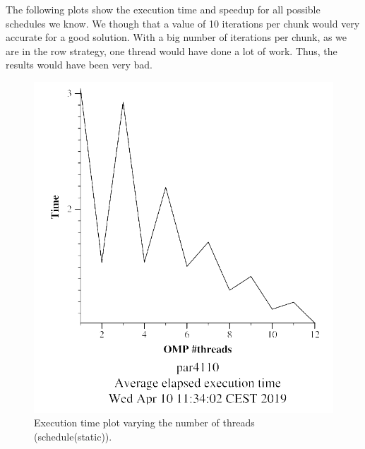 \documentclass[12pt, a4paper]{article}
\begin{document}
The following plots show the execution time and speedup for all possible schedules we know. We though that a value of 10 iterations per chunk would very accurate for a good solution. With a big number of iterations per chunk, as we are in the row strategy, one thread would have done a lot of work. Thus, the results would have been very bad.

\begin{figure}[H]
\centering
\begin{minipage}[b]{0.4\linewidth}
  \centering
  \includegraphics[scale=0.5]{./mandel-omp-10000-strong-omp-for-static-time}
  \caption{Execution time plot varying the number of threads (schedule(static)).}
  \label{fig:mandel-omp-10000-strong-omp-for-static-time}
\end{minipage}%
\hspace{0.5cm}
\begin{minipage}[b]{0.4\linewidth}
  \centering

\end{minipage}
\end{figure}
\end{document}

